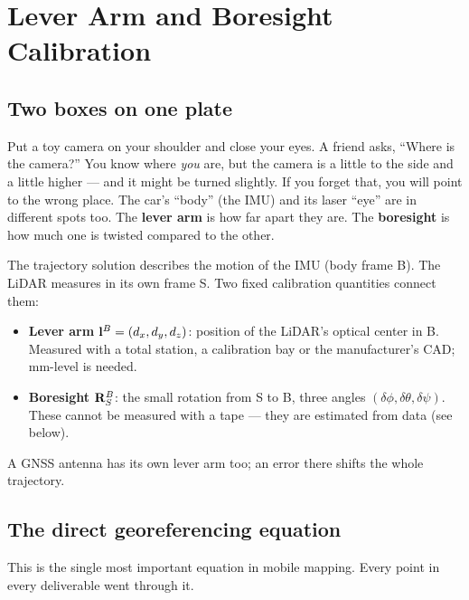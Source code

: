 \chapter{Lever Arm and Boresight Calibration}

\section{Two boxes on one plate}
\begin{kid}
Put a toy camera on your shoulder and close your eyes. A friend asks, ``Where is the camera?'' You know where \emph{you} are, but the camera is a little to the side and a little higher --- and it might be turned slightly. If you forget that, you will point to the wrong place. The car's ``body'' (the IMU) and its laser ``eye'' are in different spots too. The \textbf{lever arm} is how far apart they are. The \textbf{boresight} is how much one is twisted compared to the other.
\end{kid}


\begin{eng}
The trajectory solution describes the motion of the IMU (body frame B). The LiDAR measures in its own frame S. Two fixed calibration quantities connect them:
\begin{itemize}
\item \textbf{Lever arm} $\mathbf{l}^{B}=(d_x,d_y,d_z)$: position of the LiDAR's optical center in B. Measured with a total station, a calibration bay or the manufacturer's CAD; mm-level is needed.
\item \textbf{Boresight} $\mathbf{R}^{B}_{S}$: the small rotation from S to B, three angles $(\delta\phi,\delta\theta,\delta\psi)$. These cannot be measured with a tape --- they are estimated from data (see below).
\end{itemize}
A GNSS antenna has its own lever arm too; an error there shifts the whole trajectory.
\end{eng}

\section{The direct georeferencing equation}
This is the single most important equation in mobile mapping. Every point in every deliverable went through it.


